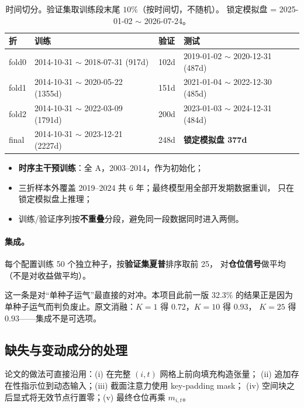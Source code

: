 \documentclass[11pt, a4paper]{ctexart}
\begin{document}
\begin{table}[h]
\centering
\small
\begin{tabular}{llll}
\toprule
折 & 训练 & 验证 & 测试 \\
\midrule
fold0 & 2014-10-31 $\sim$ 2018-07-31 (917d) & 102d & 2019-01-02 $\sim$ 2020-12-31 (487d) \\
fold1 & 2014-10-31 $\sim$ 2020-05-22 (1355d) & 151d & 2021-01-04 $\sim$ 2022-12-30 (485d) \\
fold2 & 2014-10-31 $\sim$ 2022-03-09 (1791d) & 200d & 2023-01-03 $\sim$ 2024-12-31 (484d) \\
\midrule
final & 2014-10-31 $\sim$ 2023-12-21 (2227d) & 248d & \textbf{锁定模拟盘 377d} \\
\bottomrule
\end{tabular}
\caption{时间切分。验证集取训练段末尾 $10\%$（按时间切，不随机）。
锁定模拟盘 = 2025-01-02 $\sim$ 2026-07-24。}
\end{table}

\begin{itemize}
  \item \textbf{时序主干预训练}：全 A，2003--2014，作为初始化；
  \item 三折样本外覆盖 2019--2024 共 6 年；最终模型用全部开发期数据重训，
        只在锁定模拟盘上推理；
  \item 训练/验证序列按\textbf{不重叠}分段，避免同一段数据同时进入两侧。
\end{itemize}

\paragraph{集成。}每个配置训练 50 个独立种子，按\textbf{验证集夏普}排序取前 25，
对\textbf{仓位信号}做平均（不是对收益做平均）。

\begin{warnbox}
这一条是对“单种子运气”最直接的对冲。本项目此前一版 32.3\% 的结果正是因为
单种子运气而判负废止。原文消融：$K{=}1$ 得 $0.72$，$K{=}10$ 得 $0.93$，
$K{=}25$ 得 $0.93$——集成不是可选项。
\end{warnbox}

\subsection{缺失与变动成分的处理}
论文的做法可直接沿用：(i) 在完整 $(i,t)$ 网格上前向填充构造张量；
(ii) 追加存在性指示位到动态输入；(iii) 截面注意力使用 key-padding mask；
(iv) 空间块之后显式将无效节点行置零；(v) 最终仓位再乘 $m_{i,t}$。
\end{document}
